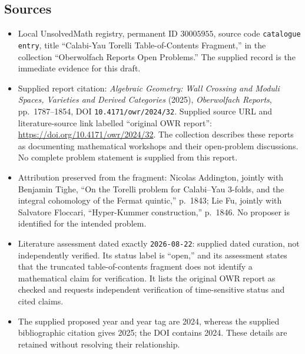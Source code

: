 \documentclass[11pt]{article}
\begin{document}
\subsection{Sources}
\begin{itemize}
\item Local UnsolvedMath registry, permanent ID \(30005955\), source code \texttt{catalogue entry}, title ``Calabi-Yau Torelli Table-of-Contents Fragment,'' in the collection ``Oberwolfach Reports Open Problems.'' The supplied record is the immediate evidence for this draft.
\item Supplied report citation: \emph{Algebraic Geometry: Wall Crossing and Moduli Spaces, Varieties and Derived Categories} (2025), \emph{Oberwolfach Reports}, pp.~1787--1854, DOI \texttt{10.4171/owr/2024/32}. Supplied source URL and literature-source link labelled ``original OWR report'': \url{https://doi.org/10.4171/owr/2024/32}. The collection describes these reports as documenting mathematical workshops and their open-problem discussions. No complete problem statement is supplied from this report.
\item Attribution preserved from the fragment: Nicolas Addington, jointly with Benjamin Tighe, ``On the Torelli problem for Calabi--Yau 3-folds, and the integral cohomology of the Fermat quintic,'' p.~1843; Lie Fu, jointly with Salvatore Floccari, ``Hyper-Kummer construction,'' p.~1846. No proposer is identified for the intended problem.
\item Literature assessment dated exactly \texttt{2026-08-22}: supplied dated curation, not independently verified. Its status label is ``open,'' and its assessment states that the truncated table-of-contents fragment does not identify a mathematical claim for verification. It lists the original OWR report as checked and requests independent verification of time-sensitive status and cited claims.
\item The supplied proposed year and year tag are 2024, whereas the supplied bibliographic citation gives 2025; the DOI contains 2024. These details are retained without resolving their relationship.
\end{itemize}
\end{document}
